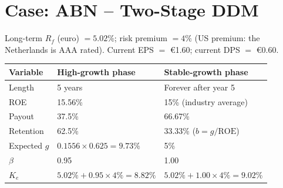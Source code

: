 \section{Case: ABN -- Two-Stage DDM}

\begin{exbox}
Long-term $R_f$ (euro) $=5.02\%$; risk premium $=4\%$ (US premium: the Netherlands is AAA rated). Current EPS $=$ \euro1.60; current DPS $=$ \euro0.60.
\begin{center}
\small
\begin{tabular}{@{}lll@{}}
\toprule
\textbf{Variable} & \textbf{High-growth phase} & \textbf{Stable-growth phase}\\
\midrule
Length & 5 years & Forever after year 5\\
ROE & 15.56\% & 15\% (industry average)\\
Payout & 37.5\% & 66.67\%\\
Retention & 62.5\% & 33.33\% ($b=g/\text{ROE}$)\\
Expected $g$ & $0.1556\times0.625=9.73\%$ & 5\%\\
$\beta$ & 0.95 & 1.00\\
$K_e$ & $5.02\%+0.95\times4\%=8.82\%$ & $5.02\%+1.00\times4\%=9.02\%$\\
\bottomrule
\end{tabular}
\end{center}
\end{exbox}


